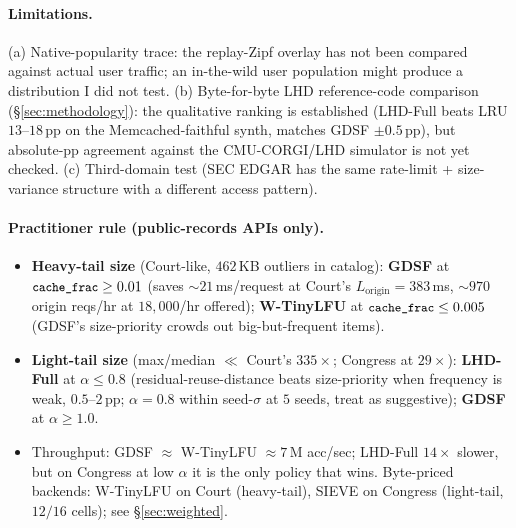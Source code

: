 \documentclass[letterpaper,twocolumn,10pt]{article}
\newcommand{\code}[1]{\texttt{\small #1}}
\begin{document}
\paragraph{Limitations.} (a) Native-popularity trace: the
replay-Zipf overlay has not been compared against actual user traffic; an in-the-wild user population
might produce a distribution I did not test. (b) Byte-for-byte
LHD reference-code comparison (\S\ref{sec:methodology}): the
qualitative ranking is established (LHD-Full beats LRU $13$--$18$\,pp
on the Memcached-faithful synth, matches GDSF $\pm 0.5$\,pp), but
absolute-pp agreement against the CMU-CORGI/LHD simulator is not yet
checked. (c) Third-domain test (SEC EDGAR has
the same rate-limit + size-variance structure with a different
access pattern).

\paragraph{Practitioner rule (public-records APIs only).}
\begin{itemize}[leftmargin=*,itemsep=1pt,topsep=1pt]
  \item \textbf{Heavy-tail size} (Court-like, $462$\,KB outliers in
    catalog): \textbf{GDSF} at $\code{cache\_frac} \geq 0.01$ (saves
    $\sim 21$\,ms/request at Court's $L_{\text{origin}}=383$\,ms,
    $\sim 970$ origin reqs/hr at $18{,}000$/hr offered);
    \textbf{W-TinyLFU} at $\code{cache\_frac} \leq 0.005$ (GDSF's
    size-priority crowds out big-but-frequent items).
  \item \textbf{Light-tail size} (max/median $\ll$ Court's $335\times$;
    Congress at $29\times$): \textbf{LHD-Full} at $\alpha \leq 0.8$
    (residual-reuse-distance beats size-priority when frequency is
    weak, $0.5$--$2$\,pp; $\alpha=0.8$ within seed-$\sigma$ at $5$
    seeds, treat as suggestive); \textbf{GDSF} at $\alpha \geq 1.0$.
  \item Throughput: GDSF $\approx$ W-TinyLFU $\approx 7$\,M acc/sec;
    LHD-Full $14\times$ slower, but on Congress at low $\alpha$ it
    is the only policy that wins. Byte-priced backends:
    W-TinyLFU on Court (heavy-tail), SIEVE on Congress (light-tail,
    $12/16$ cells); see \S\ref{sec:weighted}.
\end{itemize}
\end{document}
